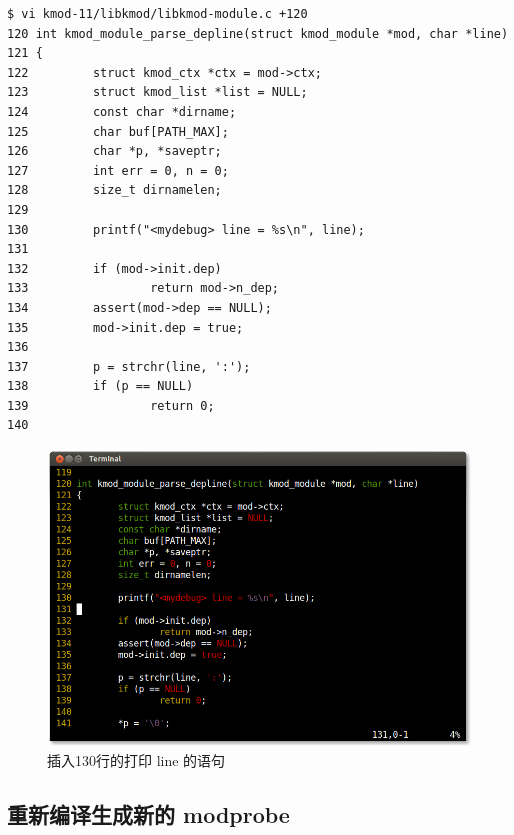 {\begin{shaded}\begin{verbatim}
$ vi kmod-11/libkmod/libkmod-module.c +120
120 int kmod_module_parse_depline(struct kmod_module *mod, char *line)
121 {
122         struct kmod_ctx *ctx = mod->ctx;
123         struct kmod_list *list = NULL;
124         const char *dirname;
125         char buf[PATH_MAX];
126         char *p, *saveptr;
127         int err = 0, n = 0;
128         size_t dirnamelen;
129 
130         printf("<mydebug> line = %s\n", line);
131 
132         if (mod->init.dep)
133                 return mod->n_dep;
134         assert(mod->dep == NULL);
135         mod->init.dep = true;
136 
137         p = strchr(line, ':');
138         if (p == NULL)
139                 return 0;
140 
\end{verbatim}\end{shaded}}
\begin{figure}[htbp]
\centering
\includegraphics{./pictures/3-1-depline.png}
\caption{插入130行的打印 line 的语句}
\end{figure}

\subsection{重新编译生成新的 modprobe}


